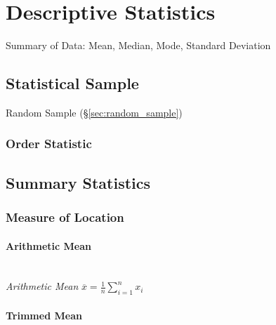 \section{Descriptive Statistics}\label{sec:descriptive_statistics}

Summary of Data: Mean, Median, Mode, Standard Deviation



\subsection{Statistical Sample}\label{sec:statistical_sample}

Random Sample (\S\ref{sec:random_sample})



\subsubsection{Order Statistic}\label{sec:order_statistic}



\subsection{Summary Statistics}\label{sec:summary_statistics}

\subsubsection{Measure of Location}\label{sec:location_measure}

\paragraph{Arithmetic Mean}\label{sec:arithmetic_mean}
\hfill \\

\emph{Arithmetic Mean} $\overline{x} = \frac{1}{n}\sum_{i=1}^n x_i$



\paragraph{Trimmed Mean}\label{sec:trimmed_mean}

